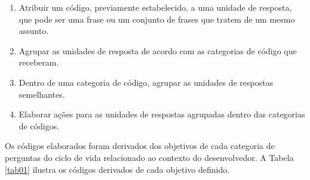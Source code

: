 \begin{enumerate}
	\item Atribuir um código, previamente estabelecido, a uma unidade de resposta, que pode ser uma frase ou um conjunto de frases que tratem de um mesmo assunto.
	\item Agrupar as unidades de resposta de acordo com as categorias de código que receberam.
	\item Dentro de uma categoria de código, agrupar as unidades de respostas semelhantes.
	\item Elaborar ações para as unidades de respostas agrupadas dentro das categorias de códigos.
\end{enumerate}

Os códigos elaborados foram derivados dos objetivos de cada categoria de perguntas do ciclo de vida relacionado ao contexto do desenvolvedor. A Tabela \ref{tab01} ilustra os códigos derivados de cada objetivo definido.

